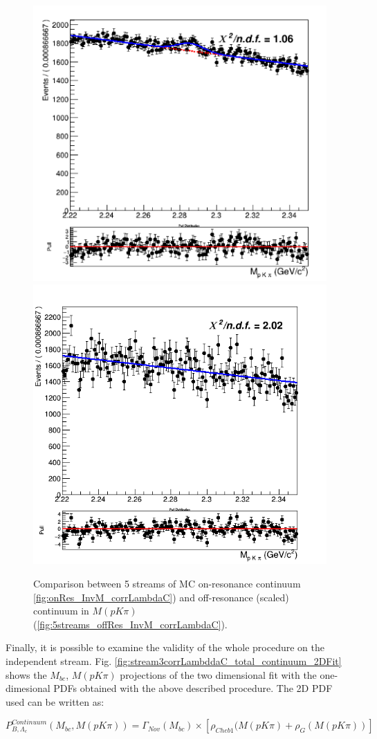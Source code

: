 \begin{figure}[H]
\centering
\subcaptionbox{\label{fig:onRes_InvM_corrLambdaC}}
{\includegraphics[width=.45\textwidth]{04-chargedCorrBtoLambda/figs/onRes_InvM_corrLambdaC.png}} 
\subcaptionbox{\label{fig:5streams_offRes_InvM_corrLambdaC}}
{\includegraphics[width=.46\textwidth]{04-chargedCorrBtoLambda/figs/5streams_Off_resonanceRescaledContinuum_charged_corrLambdaC_oneGaussianInvMfit.png}} 
\caption{Comparison between 5 streams of MC on-resonance continuum \ref{fig:onRes_InvM_corrLambdaC}) and off-resonance (scaled) continuum in $M(p K \pi)$ (\ref{fig:5streams_offRes_InvM_corrLambdaC}).}
\end{figure}



Finally, it is possible to examine the validity of the whole procedure on the independent stream. 
Fig. \ref{fig:stream3corrLambddaC_total_continuum_2DFit} shows the $M_{bc}$, $M(p K \pi)$ projections of the two dimensional fit with the one-dimesional PDFs obtained with the above described procedure.
The 2D PDF used can be written as: \\
 \vspace{0.2 cm}

$P^{Continuum}_{B,\Lambda_c}(M_{bc}, M(p K \pi)) = \Gamma_{Nov}(M_{bc}) \times [\rho_{Cheb1}(M(p K \pi) + \rho_{G}(M(p K \pi))]$\\
\vspace{0.2 cm}

